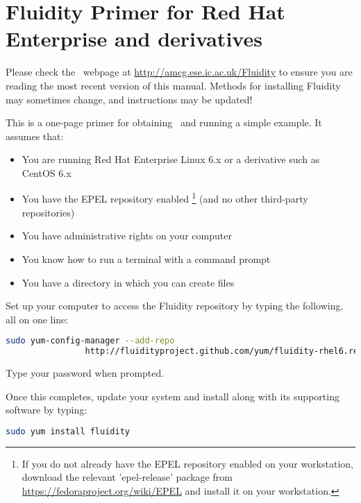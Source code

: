 \chapter*{Fluidity Primer for Red Hat Enterprise and derivatives}

Please check the \fluidity\ webpage at
\href{http://amcg.ese.ic.ac.uk/Fluidity}{http://amcg.ese.ic.ac.uk/Fluidity}
to ensure you are reading the most recent version of this manual. Methods for
installing Fluidity may sometimes change, and instructions may be updated!

This is a one-page primer for obtaining \fluidity\ and running a simple example. It assumes that:

\begin{itemize}
 \item You are running Red Hat Enterprise Linux 6.x or a derivative such as CentOS 6.x
 \item You have the EPEL repository enabled
         \footnote{
           If you do not already have the EPEL repository enabled on your workstation, 
           download the relevant 'epel-release' package from
           \href{https://fedoraproject.org/wiki/EPEL}{https://fedoraproject.org/wiki/EPEL}
           and install it on your workstation. 
         }
         (and no other third-party repositories)
 \item You have administrative rights on your computer
 \item You know how to run a terminal with a command prompt
 \item You have a directory in which you can create files
\end{itemize}

Set up your computer to access the Fluidity repository by typing the following,
all on one line:

\begin{lstlisting}[language=Bash]
sudo yum-config-manager --add-repo
                http://fluidityproject.github.com/yum/fluidity-rhel6.repo
\end{lstlisting}

Type your password when prompted.

Once this completes, update your system and install \fluidity along with its
supporting software by typing:

\begin{lstlisting}[language=Bash]
sudo yum install fluidity
\end{lstlisting}

